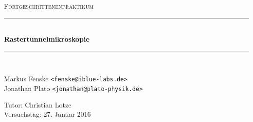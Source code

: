 \newcommand{\HRule}{\rule{\linewidth}{0.5mm}}
\renewcommand\contentsname{}

\begin{center}
  \textsc{\Large Fortgeschrittenenpraktikum}
  \HRule\\[0.4 cm]
  {\huge \bfseries Rastertunnelmikroskopie}
  \HRule\\[0.4 cm]

  \begin{minipage}{0.60\textwidth}
  \begin{flushleft}
    Markus Fenske \texttt{<fenske@iblue-labs.de>} \\
    Jonathan Plato \texttt{<jonathan@plato-physik.de>}
  \end{flushleft}
  \end{minipage}
  \hfill
  \begin{minipage}{0.35\textwidth}
  \begin{flushright}
    Tutor: Christian Lotze \\
    Versuchstag: 27. Januar 2016
  \end{flushright}
  \end{minipage}

  \renewcommand{\baselinestretch}{1.45}\normalsize
  \tableofcontents
  \renewcommand{\baselinestretch}{1.0}\normalsize


  \vfill
\end{center}
\newpage
